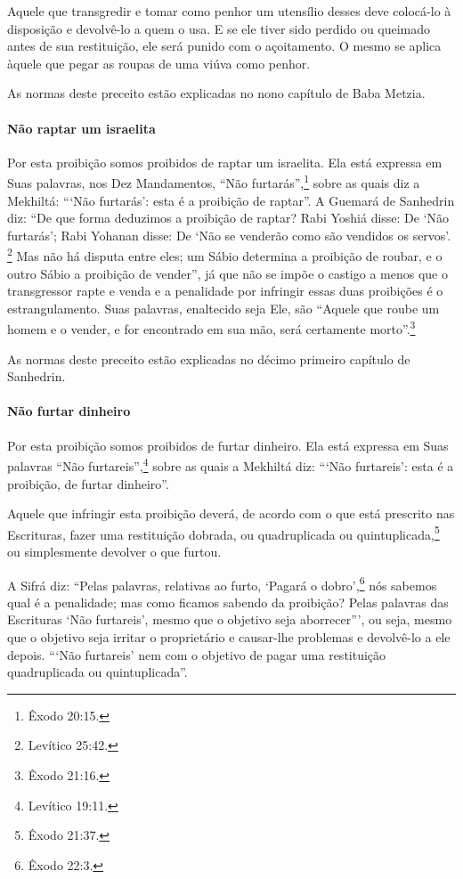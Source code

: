 Aquele que transgredir e tomar como penhor um utensílio desses deve
colocá-lo à disposição e devolvê-lo a quem o usa. E se ele tiver sido
perdido ou queimado antes de sua restituição, ele será punido com o
açoitamento. O mesmo se aplica àquele que pegar as roupas de uma viúva
como penhor.

As normas deste preceito estão explicadas no nono capítulo de Baba Metzia.

\paragraph{Não raptar um israelita}

Por esta proibição somos proibidos de raptar um israelita. Ela está
expressa em Suas palavras, nos Dez Mandamentos, ``Não furtarás'',\footnote{Êxodo
20:15.} sobre as quais diz a Mekhiltá: ```Não furtarás': esta é a
proibição de raptar''. A Guemará de Sanhedrin diz: ``De que forma
deduzimos a proibição de raptar? Rabi Yoshiá disse: De `Não furtarás';
Rabi Yohanan disse: De `Não se venderão como são vendidos os servos'. \footnote{Levítico 25:42.} Mas não há disputa entre eles; um Sábio determina a
proibição de roubar, e o outro Sábio a proibição de vender'', já que
não se impõe o castigo a menos que o transgressor rapte e venda
e a penalidade por infringir essas duas proibições é o estrangulamento.
Suas palavras, enaltecido seja Ele, são ``Aquele que roube um homem e
o vender, e for encontrado em sua mão, será certamente morto''.\footnote{Êxodo 21:16.}

As normas deste preceito estão explicadas no décimo primeiro capítulo de Sanhedrin.
  

\paragraph{Não furtar dinheiro}

Por esta proibição somos proibidos de furtar dinheiro. Ela está
expressa em Suas palavras ``Não furtareis'',\footnote{Levítico 19:11.} sobre as
quais a Mekhiltá diz: ```Não furtareis': esta é a proibição, de furtar
dinheiro''.

Aquele que infringir esta proibição deverá, de acordo com o que está
prescrito nas Escrituras, fazer uma restituição dobrada, ou
quadruplicada ou quintuplicada,\footnote{Êxodo 21:37.} ou simplesmente
devolver o que furtou.

A Sifrá diz: ``Pelas palavras, relativas ao furto, `Pagará o dobro',\footnote{Êxodo 22:3.} nós sabemos qual é a penalidade; mas como ficamos sabendo
da proibição? Pelas palavras das Escrituras `Não furtareis', mesmo que
o objetivo seja aborrecer''', ou seja, mesmo que o objetivo seja irritar
o proprietário e causar-lhe problemas e devolvê-lo a ele depois. ```Não
furtareis' nem com o objetivo de pagar uma restituição quadruplicada ou
quintuplicada''.

